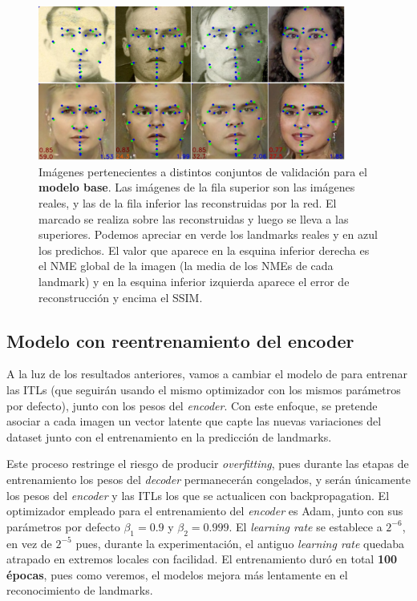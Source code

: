         \begin{figure}[H]
            \centering
            \includegraphics[width=0.9\textwidth]{img/image_basemodel.png}
            \caption{Imágenes pertenecientes a distintos conjuntos de validación para el \textbf{modelo base}. Las imágenes de la fila superior son las imágenes reales, y las de la fila inferior las reconstruidas por la red. El marcado se realiza sobre las reconstruidas y luego se lleva a las superiores. Podemos apreciar en verde los landmarks reales y  en azul los predichos. El valor que aparece en la esquina inferior derecha es el NME global de la imagen (la media de los NMEs de cada landmark) y en la esquina inferior izquierda aparece el error de reconstrucción y encima el SSIM.}
            \label{fig:Ejemplo_ModelBase}
        \end{figure}

    \subsection{Modelo con reentrenamiento del encoder}
        \noindent A la luz de los resultados anteriores, vamos a cambiar el modelo de para entrenar las ITLs (que seguirán usando el mismo optimizador con los mismos parámetros por defecto), junto con los pesos del \textit{encoder}. Con este enfoque, se pretende asociar a cada imagen un vector latente que capte las nuevas variaciones del dataset junto con el entrenamiento en la predicción de landmarks.

        \medskip

        \noindent Este proceso restringe el riesgo de producir \textit{overfitting}, pues durante las etapas de entrenamiento los pesos del \textit{decoder} permanecerán congelados, y serán únicamente los pesos del \textit{encoder} y las ITLs los que se actualicen con backpropagation. El optimizador empleado para el entrenamiento del \textit{encoder} es Adam, junto con sus parámetros por defecto $\beta_1=0.9$ y $\beta_2=0.999$. El \textit{learning rate} se establece a $2^{-6}$, en vez de $2^{-5}$ pues, durante la experimentación, el antiguo \textit{learning rate} quedaba atrapado en extremos locales con facilidad. El entrenamiento duró en total \textbf{100 épocas}, pues como veremos, el modelos mejora más lentamente en el reconocimiento de landmarks.

